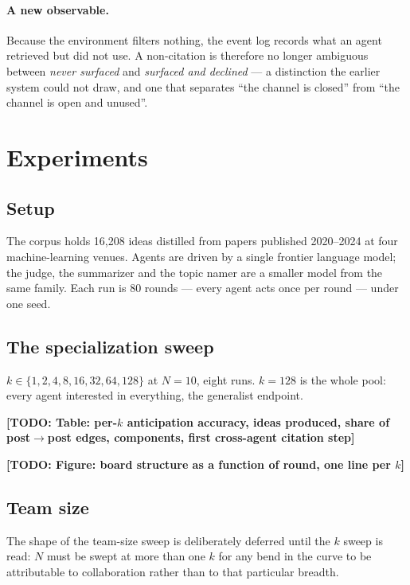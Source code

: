 \documentclass[sigconf,anonymous]{aamas}
\newcommand{\TODORESULT}[1]{\textbf{[TODO: #1]}}
\begin{document}
\paragraph{A new observable.}
Because the environment filters nothing, the event log records what an agent
retrieved but did not use. A non-citation is therefore no longer ambiguous
between \emph{never surfaced} and \emph{surfaced and declined} --- a
distinction the earlier system could not draw, and one that separates ``the
channel is closed'' from ``the channel is open and unused''.

\section{Experiments}

\subsection{Setup}

The corpus holds 16{,}208 ideas distilled from papers published 2020--2024 at
four machine-learning venues. Agents are driven by a single frontier
language model; the judge, the summarizer and the topic namer are a smaller
model from the same family. Each run is 80 rounds --- every agent acts once per
round --- under one seed.

\subsection{The specialization sweep}

$k \in \{1, 2, 4, 8, 16, 32, 64, 128\}$ at $N{=}10$, eight runs. $k{=}128$ is
the whole pool: every agent interested in everything, the generalist endpoint.

\TODORESULT{Table: per-$k$ anticipation accuracy, ideas produced, share of
post$\to$post edges, components, first cross-agent citation step}

\TODORESULT{Figure: board structure as a function of round, one line per $k$}

\subsection{Team size}

The shape of the team-size sweep is deliberately deferred until the $k$ sweep
is read: $N$ must be swept at more than one $k$ for any bend in the curve to be
attributable to collaboration rather than to that particular breadth.
\end{document}
